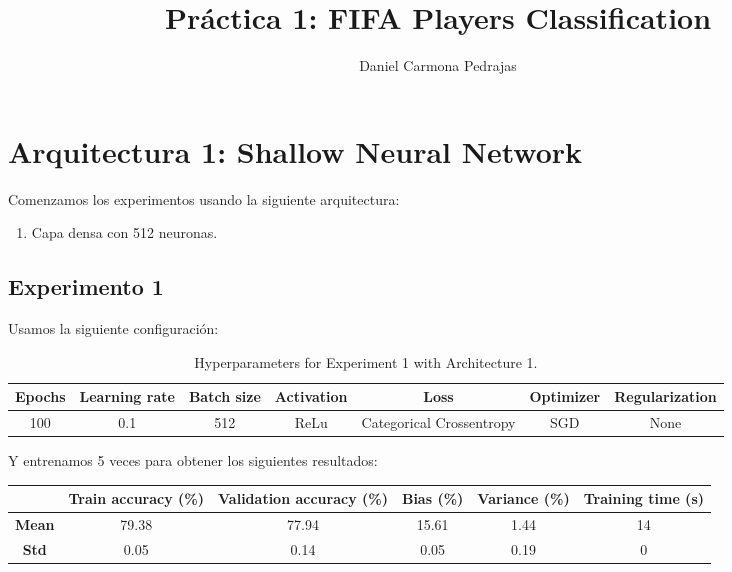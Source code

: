 \documentclass{article}
\begin{document}
\title{Pr\'actica 1: FIFA Players Classification}

\author{{Daniel Carmona Pedrajas}}

\date{}
\maketitle



\section{Arquitectura 1: Shallow Neural Network}
	Comenzamos los experimentos usando la siguiente arquitectura:
	\begin{enumerate}
		\item Capa densa con 512 neuronas.
	\end{enumerate}
	\subsection{Experimento 1}
		Usamos la siguiente configuraci\'on:
		\begin{table}[h]
			\begin{center}
				\begin{tabular}{ c | c | c | c | c | c | c }
					\textbf{Epochs} & \textbf{Learning rate} & \textbf{Batch size} & \textbf{Activation} & \textbf{Loss} & \textbf{Optimizer} & \textbf{Regularization} \\ \hline
					100 & 0.1 & 512 & ReLu & Categorical Crossentropy & SGD & None
				\end{tabular}
				\caption{Hyperparameters for Experiment 1 with Architecture 1.}
				\label{tab:exp1-1}
			\end{center}
		\end{table}
		
		Y entrenamos 5 veces para obtener los siguientes resultados:
		\begin{table}[h]
			\begin{center}
				\begin{tabular}{ c | c | c | c | c | c |}
					\ & \textbf{Train accuracy (\%)} & \textbf{Validation accuracy (\%)} & \textbf{Bias (\%)} & \textbf{Variance (\%)} & \textbf{Training time (s)} \\ \hline
					\textbf{Mean} & 79.38 & 77.94 & 15.61 & 1.44 & 14\\ \hline
					\textbf{Std} & 0.05 & 0.14 & 0.05 & 0.19 & 0 \\ \hline
				\end{tabular}
			\end{center}
		\end{table}
		
\end{document}
